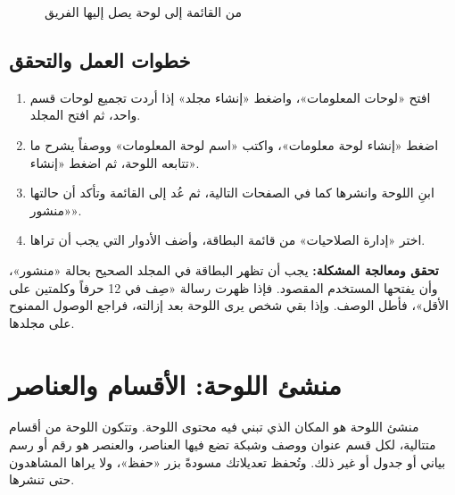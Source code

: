 \begin{figure}[H]
\centering
{}
\rclegend
\caption{من القائمة إلى لوحة يصل إليها الفريق}
\label{fig:builder-dashboards-flow}
\end{figure}

\subsection{خطوات العمل والتحقق}
\begin{enumerate}
\item افتح «لوحات المعلومات»، واضغط «إنشاء مجلد» إذا أردت تجميع لوحات قسم واحد، ثم افتح المجلد.
\item اضغط «إنشاء لوحة معلومات»، واكتب «اسم لوحة المعلومات» ووصفاً يشرح ما تتابعه اللوحة، ثم اضغط «إنشاء».
\item ابنِ اللوحة وانشرها كما في الصفحات التالية، ثم عُد إلى القائمة وتأكد أن حالتها «منشور».
\item اختر «إدارة الصلاحيات» من قائمة البطاقة، وأضف الأدوار التي يجب أن تراها.
\end{enumerate}

\textbf{تحقق ومعالجة المشكلة:} يجب أن تظهر البطاقة في المجلد الصحيح بحالة «منشور»، وأن يفتحها المستخدم المقصود. فإذا ظهرت رسالة «صِف في 12 حرفاً وكلمتين على الأقل»، فأطل الوصف. وإذا بقي شخص يرى اللوحة بعد إزالته، فراجع الوصول الممنوح على مجلدها.

\clearpage
\section{منشئ اللوحة: الأقسام والعناصر}
\label{sec:builder-feature-dashboards-builder}

منشئ اللوحة هو المكان الذي تبني فيه محتوى اللوحة. وتتكون اللوحة من أقسام متتالية، لكل قسم عنوان ووصف وشبكة تضع فيها العناصر، والعنصر هو رقم أو رسم بياني أو جدول أو غير ذلك. وتُحفظ تعديلاتك مسودةً بزر «حفظ»، ولا يراها المشاهدون حتى تنشرها.

